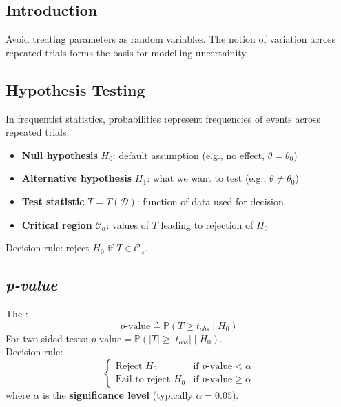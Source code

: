 \subsection{Introduction}
Avoid treating parameters as random variables.
The notion of variation across repeated trials forms the basis for modelling
uncertainity.


\subsection{Hypothesis Testing}
In frequentist statistics, probabilities represent frequencies of events across repeated trials.
\begin{itemize}
    \item \textbf{Null hypothesis} $H_0$: default assumption (e.g., no effect, $\theta = \theta_0$)
    \item \textbf{Alternative hypothesis} $H_1$: what we want to test (e.g., $\theta \neq \theta_0$)
    \item \textbf{Test statistic} $T = T(\mathcal{D})$: function of data used for decision
    \item \textbf{Critical region} $\mathcal{C}_\alpha$: values of $T$ leading to rejection of $H_0$
\end{itemize}
Decision rule: reject $H_0$ if $T \in \mathcal{C}_\alpha$.

\subsection{\emph{p-value}}
The :
$$p\text{-value} \triangleq \mathbb{P}(T \geq t_{obs} \mid H_0)$$
For two-sided tests: $p\text{-value} = \mathbb{P}(|T| \geq |t_{obs}| \mid H_0)$.\\
Decision rule:
$$\begin{cases}
    \text{Reject } H_0 & \text{if } p\text{-value} < \alpha \\
    \text{Fail to reject } H_0 & \text{if } p\text{-value} \geq \alpha
\end{cases}$$
where $\alpha$ is the \textbf{significance level} (typically $\alpha = 0.05$).


